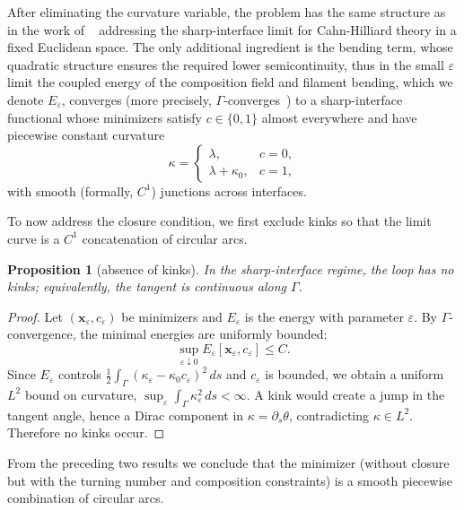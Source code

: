 \documentclass[
aip,
jcp,
reprint, 
floatfix
]{revtex4-1}
\newtheorem{proposition}[theorem]{Proposition}
\begin{document}
After eliminating the curvature variable, the problem has the same structure as in the work of  ~\cite{modica1987gradient} addressing the sharp-interface limit for Cahn-Hilliard theory in a fixed Euclidean space. The only additional ingredient is the bending term, whose quadratic structure ensures the required lower semicontinuity, thus in the small $\varepsilon$ limit the coupled energy of the composition field and filament bending, which we denote $E_\varepsilon$, converges (more precisely, $\Gamma$-converges~\cite{modica1987gradient}) to a sharp-interface functional whose minimizers satisfy $c\in\{0,1\}$ almost everywhere and have piecewise constant curvature
\[
\kappa=
\begin{cases}
\lambda, & c=0,\\
\lambda+\kappa_0, & c=1,
\end{cases}
\]
with smooth (formally, $C^1$) junctions across interfaces.

To now address the closure condition, we first exclude kinks so that the limit curve is a $C^1$ concatenation of circular arcs.

\begin{proposition}[absence of kinks]\label{prop:no_kink}
In the sharp-interface regime, the loop has no kinks; equivalently, the tangent is continuous along $\Gamma$.
\end{proposition}

\begin{proof}
Let $(\mathbf x_\varepsilon,c_\varepsilon)$ be minimizers and $E_\varepsilon$ is the energy with parameter $\varepsilon$. By $\Gamma$-convergence, the minimal energies are uniformly bounded:
\[
\sup_{\varepsilon\downarrow0}E_\varepsilon[\mathbf x_\varepsilon,c_\varepsilon]\le C.
\]
Since $E_\varepsilon$ controls $\frac12\int_\Gamma(\kappa_\varepsilon-\kappa_0c_\varepsilon)^2\,ds$ and $c_\varepsilon$ is bounded, we obtain a uniform $L^2$ bound on curvature,
$\sup_{\varepsilon}\int_\Gamma \kappa_\varepsilon^2\,ds<\infty$.
A kink would create a jump in the tangent angle, hence a Dirac component in $\kappa=\partial_s\theta$, contradicting $\kappa\in L^2$. Therefore no kinks occur.
\end{proof}

From the preceding two results we conclude that the minimizer (without closure but with the turning number and composition constraints) is a smooth piecewise combination of circular arcs. 
\end{document}
